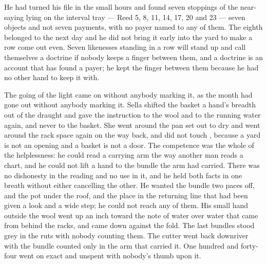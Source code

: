 He had turned his file in the small hours and found seven stoppings of the near-saying lying on the interval tray --- Reed 5, 8, 11, 14, 17, 20 and 23 --- seven objects and not seven payments, with no payer named to any of them. The eighth belonged to the next day and he did not bring it early into the yard to make a row come out even. Seven likenesses standing in a row will stand up and call themselves a doctrine if nobody keeps a finger between them, and a doctrine is an account that has found a payer; he kept the finger between them because he had no other hand to keep it with.

\scenebreak

The going of the light came on without anybody marking it, as the month had gone out without anybody marking it. Sella shifted the basket a hand's breadth out of the draught and gave the instruction to the wool and to the running water again, and never to the basket. She went around the pan set out to dry and went around the rack space again on the way back, and did not touch , because a yard is not an opening and a basket is not a door. The competence was the whole of the helplessness: he could read a carrying arm the way another man reads a chart, and he could not lift a hand to the bundle the arm had carried. There was no dishonesty in the reading and no use in it, and he held both facts in one breath without either cancelling the other. He wanted the bundle two paces off, and the pot under the roof, and the place in the returning line that had been given a look and a wide step; he could not reach any of them. His small hand outside the wool went up an inch toward the note of water over water that came from behind the racks, and came down against the fold. The last bundles stood grey in the ruts with nobody counting them. The cutter went back downriver with the bundle counted only in the arm that carried it. One hundred and forty-four went on exact and unspent with nobody's thumb upon it.
